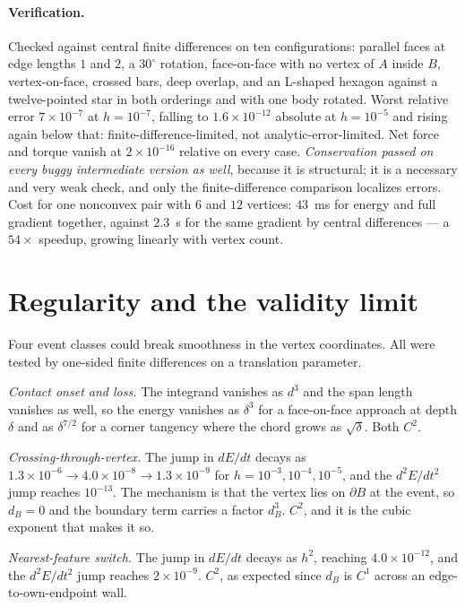 \documentclass[11pt]{article}
\begin{document}
\paragraph{Verification.} Checked against central finite differences on ten configurations: parallel faces at edge lengths $1$ and $2$, a $30^\circ$ rotation, face-on-face with no vertex of $A$ inside $B$, vertex-on-face, crossed bars, deep overlap, and an L-shaped hexagon against a twelve-pointed star in both orderings and with one body rotated. Worst relative error $7\times10^{-7}$ at $h = 10^{-7}$, falling to $1.6\times10^{-12}$ absolute at $h = 10^{-5}$ and rising again below that: finite-difference-limited, not analytic-error-limited. Net force and torque vanish at $2\times10^{-16}$ relative on every case. \emph{Conservation passed on every buggy intermediate version as well}, because it is structural; it is a necessary and very weak check, and only the finite-difference comparison localizes errors. Cost for one nonconvex pair with $6$ and $12$ vertices: $43$~ms for energy and full gradient together, against $2.3$~s for the same gradient by central differences --- a $54\times$ speedup, growing linearly with vertex count.

\section{Regularity and the validity limit}
\label{sec:regularity}

Four event classes could break smoothness in the vertex coordinates. All were tested by one-sided finite differences on a translation parameter.

\emph{Contact onset and loss.} The integrand vanishes as $d^3$ and the span length vanishes as well, so the energy vanishes as $\delta^3$ for a face-on-face approach at depth $\delta$ and as $\delta^{7/2}$ for a corner tangency where the chord grows as $\sqrt\delta$. Both $C^2$.

\emph{Crossing-through-vertex.} The jump in $dE/dt$ decays as $1.3\times10^{-6}\to4.0\times10^{-8}\to1.3\times10^{-9}$ for $h = 10^{-3},10^{-4},10^{-5}$, and the $d^2E/dt^2$ jump reaches $10^{-13}$. The mechanism is that the vertex lies on $\partial B$ at the event, so $d_B = 0$ and the boundary term carries a factor $d_B^3$. $C^2$, and it is the cubic exponent that makes it so.

\emph{Nearest-feature switch.} The jump in $dE/dt$ decays as $h^2$, reaching $4.0\times10^{-12}$, and the $d^2E/dt^2$ jump reaches $2\times10^{-9}$. $C^2$, as expected since $d_B$ is $C^1$ across an edge-to-own-endpoint wall.
\end{document}
